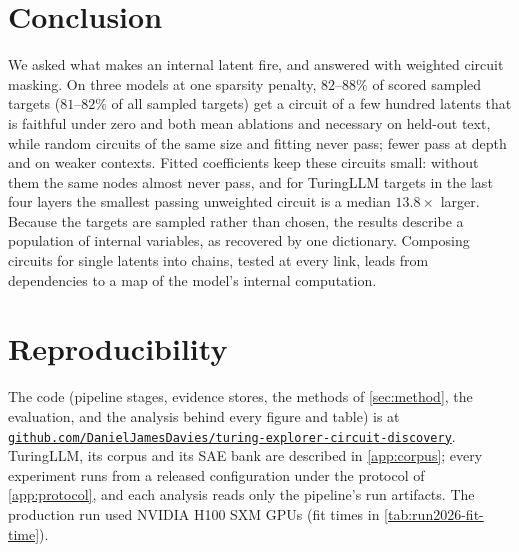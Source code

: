 \documentclass[10pt]{article}
\begin{document}
\section{Conclusion}

We asked what makes an internal latent fire, and answered with weighted circuit masking.
On three models at one sparsity penalty, $82$--$88\%$ of scored sampled targets ($81$--$82\%$ of all sampled targets) get a circuit of a few hundred latents that is faithful under zero and both mean ablations and necessary on held-out text, while random circuits of the same size and fitting never pass; fewer pass at depth and on weaker contexts.
Fitted coefficients keep these circuits small: without them the same nodes almost never pass, and for TuringLLM targets in the last four layers the smallest passing unweighted circuit is a median $13.8\times$ larger.
Because the targets are sampled rather than chosen, the results describe a population of internal variables, as recovered by one dictionary.
Composing circuits for single latents into chains, tested at every link, leads from dependencies to a map of the model's internal computation.
\label{end-of-main}

\section*{Reproducibility}
The code (pipeline stages, evidence stores, the methods of \cref{sec:method}, the evaluation, and the analysis behind every figure and table) is at \href{https://github.com/DanielJamesDavies/turing-explorer-circuit-discovery}{\nolinkurl{github.com/DanielJamesDavies/turing-explorer-circuit-discovery}}.
TuringLLM, its corpus and its SAE bank are described in \cref{app:corpus}; every experiment runs from a released configuration under the protocol of \cref{app:protocol}, and each analysis reads only the pipeline's run artifacts.
The production run used NVIDIA H100 SXM GPUs (fit times in \cref{tab:run2026-fit-time}).




\appendix
{}
\end{document}
